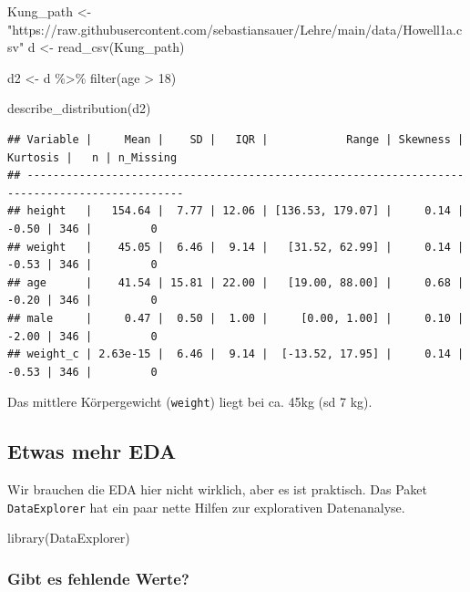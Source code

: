 \documentclass[
  a4paper,
  DIV=11]{scrreprt}
\newenvironment{Shaded}{\begin{snugshade}}{\end{snugshade}}
\newcommand{\DecValTok}[1]{\textcolor[rgb]{0.68,0.00,0.00}{#1}}
\newcommand{\FunctionTok}[1]{\textcolor[rgb]{0.28,0.35,0.67}{#1}}
\newcommand{\NormalTok}[1]{\textcolor[rgb]{0.00,0.23,0.31}{#1}}
\newcommand{\OtherTok}[1]{\textcolor[rgb]{0.00,0.23,0.31}{#1}}
\newcommand{\SpecialCharTok}[1]{\textcolor[rgb]{0.37,0.37,0.37}{#1}}
\newcommand{\StringTok}[1]{\textcolor[rgb]{0.13,0.47,0.30}{#1}}
\theoremstyle{definition}
\theoremstyle{remark}
\begin{document}
\begin{Shaded}
\begin{Highlighting}[]
\NormalTok{Kung\_path }\OtherTok{\textless{}{-}} \StringTok{"https://raw.githubusercontent.com/sebastiansauer/Lehre/main/data/Howell1a.csv"}  
\NormalTok{d }\OtherTok{\textless{}{-}} \FunctionTok{read\_csv}\NormalTok{(Kung\_path)  }

\NormalTok{d2 }\OtherTok{\textless{}{-}}\NormalTok{ d }\SpecialCharTok{\%\textgreater{}\%} \FunctionTok{filter}\NormalTok{(age }\SpecialCharTok{\textgreater{}} \DecValTok{18}\NormalTok{)}

\FunctionTok{describe\_distribution}\NormalTok{(d2)}
\end{Highlighting}
\end{Shaded}

\begin{verbatim}
## Variable |     Mean |    SD |   IQR |            Range | Skewness | Kurtosis |   n | n_Missing
## ----------------------------------------------------------------------------------------------
## height   |   154.64 |  7.77 | 12.06 | [136.53, 179.07] |     0.14 |    -0.50 | 346 |         0
## weight   |    45.05 |  6.46 |  9.14 |   [31.52, 62.99] |     0.14 |    -0.53 | 346 |         0
## age      |    41.54 | 15.81 | 22.00 |   [19.00, 88.00] |     0.68 |    -0.20 | 346 |         0
## male     |     0.47 |  0.50 |  1.00 |     [0.00, 1.00] |     0.10 |    -2.00 | 346 |         0
## weight_c | 2.63e-15 |  6.46 |  9.14 |  [-13.52, 17.95] |     0.14 |    -0.53 | 346 |         0
\end{verbatim}

Das mittlere Körpergewicht (\texttt{weight}) liegt bei ca. 45kg (sd 7
kg).

\hypertarget{etwas-mehr-eda}{%
\subsection{Etwas mehr EDA}\label{etwas-mehr-eda}}

Wir brauchen die EDA hier nicht wirklich, aber es ist praktisch. Das
Paket \texttt{DataExplorer} hat ein paar nette Hilfen zur explorativen
Datenanalyse.

\begin{Shaded}
\begin{Highlighting}[]
\FunctionTok{library}\NormalTok{(DataExplorer)}
\end{Highlighting}
\end{Shaded}

\hypertarget{gibt-es-fehlende-werte}{%
\subsubsection{Gibt es fehlende Werte?}\label{gibt-es-fehlende-werte}}
\end{document}
